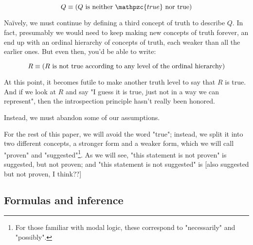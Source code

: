 \documentclass{article}
\begin{document}
  \begin{equation*}
    Q \equiv (Q \mathrm{\ is\ neither\ }\mathpzc{true}\mathrm{\ nor\ true})\\
  \end{equation*}
  
  Naïvely, we must continue by defining a third concept of truth to describe $Q$.
  In fact, presumably we would need to keep making new concepts of truth forever, an end up with an ordinal hierarchy of concepts of truth, each weaker than all the earlier ones. But even then, you'd be able to write:
  
  \begin{equation*}
    R \equiv (R \text{ is not true according to any level of the ordinal hierarchy})\\
  \end{equation*}
  
  At this point, it becomes futile to make another truth level to say that $R$ is true.
  And if we look at $R$ and say "I guess it is true, just not in a way we can represent", then the introspection principle hasn't really been honored.
  
  Instead, we must abandon some of our assumptions.
  
  For the rest of this paper, we will avoid the word "true"; instead, we split it into two different concepts, a stronger form and a weaker form, which we will call "proven" and "suggested"\footnote{For those familiar with modal logic, these correspond to "necessarily" and "possibly".}. As we will see, "this statement is not proven" is suggested, but not proven; and "this statement is not suggested" is [also suggested but not proven, I think??]
  
  \subsection{Formulas and inference}
  
  \newcommand{\name}[1]{\operatorname{\texttt{#1}}}
  \newcommand{\id}{\name{id}}
  \newcommand{\const}{\name{const}}
  \newcommand{\fuse}{\name{fuse}}
  \newcommand{\atomemptyset}{\name{empty\_set}}
  \newcommand{\atomsingleton}{\name{singleton}}
  \newcommand{\atomin}{\name{in}}
  \newcommand{\atomunion}{\name{union}}
  \newcommand{\atomconcludes}{\name{concludes}}
  \newcommand{\atomall}{\name{all}}
  \newcommand{\atominfrule}{\name{rule}}
  \renewcommand{\emptyset}{\varnothing}
  \newcommand{\singleton}[1]{\{#1\}}
  \newcommand{\union}{\cup}
  \newcommand{\all}{\bigcup}
  \newcommand{\atomequals}{\name{equals}}
  \newcommand{\equals}{\equiv}
  \newcommand{\concludes}{\leadsto}
  \newcommand{\infrule}{\vdash}
  
\end{document}
